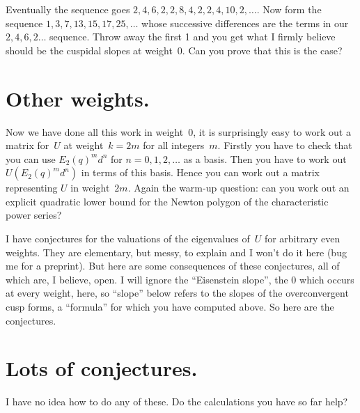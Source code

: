 \documentclass{article}
\begin{document}
Eventually the sequence goes $2,4,6,2,2,8,4,2,2,4,10,2,\ldots$.
Now form the sequence $1,3,7,13,15,17,25,\ldots$ whose successive
differences are the terms in our $2,4,6,2\ldots$ sequence. Throw away
the first 1 and you get what I firmly believe should be the cuspidal slopes
at weight~0. Can you prove that this is the case?

\section*{Other weights.}

Now we have done all this work in weight~0, it is surprisingly easy
to work out a matrix for~$U$ at weight~$k=2m$ for all integers~$m$.
Firstly you have to check that you can use $E_2(q)^md^n$ for $n=0,1,2,\ldots$
as a basis. Then you have to work out $U(E_2(q)^md^n)$ in terms of this basis.
Hence you can work out a matrix representing $U$ in weight~$2m$.
Again the warm-up question: can you work out an explicit quadratic
lower bound for the Newton polygon of the characteristic power series?

I have conjectures for the valuations of the eigenvalues of~$U$ for
arbitrary even weights. They are elementary, but messy, to explain and I won't
do it here (bug me for a preprint). But here are some consequences of these
conjectures,
all of which are, I believe, open. I will ignore the ``Eisenstein
slope'', the 0 which occurs at every weight, here, so ``slope'' below
refers to the slopes of the overconvergent cusp forms, a ``formula''
for which you have computed above. So here are the conjectures.

\section*{Lots of conjectures.}

I have no idea how to do any of these. Do the calculations you have
so far help?
\end{document}
